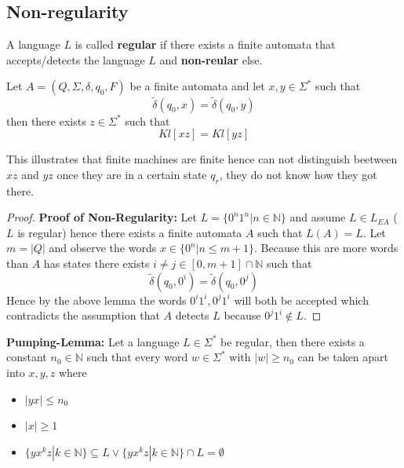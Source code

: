 \subsection{Non-regularity}

\begin{definition}
    A language $L$ is called \textbf{regular} if there exists a finite automata
    that accepts/detects the language $L$ and \textbf{non-reular} else.
\end{definition}

\begin{lemma}
    Let $A = (Q, \Sigma, \delta, q_0, F)$ be a finite automata and let
    $x,y \in \Sigma^*$ such that
    $$
        \tilde{\delta}(q_0,x) = \tilde{\delta}(q_0, y)
    $$
    then there exists $z \in \Sigma^*$ such that
    $$
        Kl[xz] = Kl[yz]
    $$
\end{lemma}

\begin{remark}
    This illustrates that finite machines are finite hence can not distinguish
    beetween $xz$ and $yz$ once they are in a certain state $q_r$, they do not
    know how they got there.
\end{remark}

\begin{proof}
    \textbf{Proof of Non-Regularity:} Let $L = \{0^n1^n | n \in \mathbb{N}\}$
    and assume $L \in L_{EA}$ ($L$ is regular) hence there exists a finite
    automata $A$ such that $L(A) = L$. Let $m = |Q|$ and observe the words
    $x \in \{0^n | n \leq m + 1 \}$. Because this are more words than $A$ has
    states there exists $i \neq j \in [0, m + 1] \cap \mathbb{N}$ such that
    $$
        \tilde{\delta}(q_0, 0^i) = \tilde{\delta}(q_0, 0^j)
    $$
    Hence by the above lemma the words $0^i1^i, 0^j1^i$ will both be accepted
    which contradicts the assumption that $A$ detects $L$ because
    $0^j1^i \notin L$.
\end{proof}

\begin{lemma}
    \textbf{Pumping-Lemma:} Let a language $L \in \Sigma^*$ be regular, then
    there exists a constant $n_0 \in \mathbb{N}$ such that every word
    $w \in \Sigma^*$ with $|w| \ge n_0$ can be taken apart into $x,y,z$ where
    \begin{itemize}
        \item $|yx| \le n_0$
        \item $|x| \ge 1$
        \item $\{yx^kz | k \in \mathbb{N} \} \subseteq L \lor \{yx^kz | k \in \mathbb{N} \} \cap L = \emptyset$
    \end{itemize}
\end{lemma}

